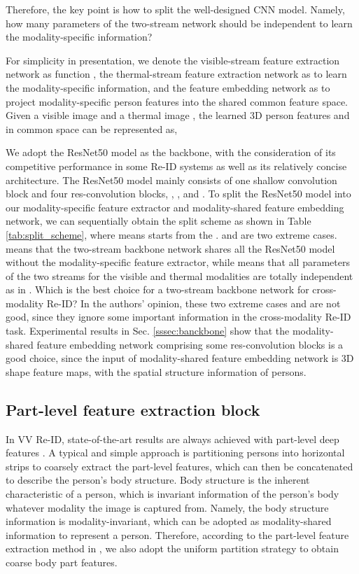 \documentclass[journal]{IEEEtran}
\begin{document}
Therefore, the key point is how to split the well-designed CNN model. Namely, how many parameters of the two-stream network should be independent to learn the modality-specific information?

For simplicity in presentation, we denote the visible-stream feature extraction network as function , the thermal-stream feature extraction network as  to learn the modality-specific information, and the feature embedding network as  to project modality-specific person features into the shared common feature space.
Given a visible image  and a thermal image , the learned 3D person features  and  in common space can be represented as,



We adopt the ResNet50 model as the backbone, with the consideration of its competitive performance in some Re-ID systems as well as its relatively concise architecture. The ResNet50 model mainly consists of one shallow convolution block  and four res-convolution blocks, , ,  and .
To split the ResNet50 model into our modality-specific feature extractor and modality-shared feature embedding network, we can sequentially obtain the split scheme as shown in Table \ref{tab:split_scheme}, where  means  starts from the  .  and  are two extreme cases.  means that the two-stream backbone network shares all the ResNet50 model without the modality-specific feature extractor, while  means that all parameters of the two streams for the visible and thermal modalities are totally independent as in \cite{ye2018visible}.
Which is the best choice for a two-stream backbone network for cross-modality Re-ID? In the authors' opinion, these two extreme cases  and  are not good, since they ignore some important information in the cross-modality Re-ID task. Experimental results in Sec. \ref{sssec:banckbone} show that the modality-shared feature embedding network comprising some res-convolution blocks is a good choice, since the input of modality-shared feature embedding network  is 3D shape feature maps, with the spatial structure information of persons.

\subsection{Part-level feature extraction block}
In VV Re-ID, state-of-the-art results are always achieved with part-level deep features \cite{Yang2020PPU,Wan2020CLPD}. A typical and simple approach is partitioning persons into horizontal strips to coarsely extract the part-level features, which can then be concatenated to describe the person's body structure. Body structure is the inherent characteristic of a person, which is invariant information of the person's body whatever modality the image is captured from. Namely, the body structure information is modality-invariant, which can be adopted as modality-shared information to represent a person.
Therefore, according to the part-level feature extraction method in \cite{sun2018beyond,wang2018learning}, we also adopt the uniform partition strategy to obtain coarse body part features.
\end{document}
